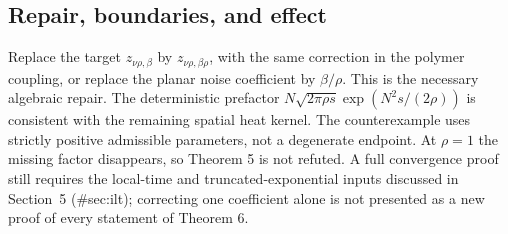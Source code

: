 \documentclass[10pt]{article}
\begin{document}
\subsection*{Repair, boundaries, and effect}
Replace the target \(z_{\nu\rho,\beta}\) by \(z_{\nu\rho,\beta\rho}\), with the same correction in the polymer coupling, or replace the planar noise coefficient by \(\beta/\rho\). This is the necessary algebraic repair. The deterministic prefactor \(N\sqrt{2\pi\rho s}\exp(N^2s/(2\rho))\) is consistent with the remaining spatial heat kernel. The counterexample uses strictly positive admissible parameters, not a degenerate endpoint. At \(\rho=1\) the missing factor disappears, so Theorem 5 is not refuted. A full convergence proof still requires the local-time and truncated-exponential inputs discussed in Section 5 (\#sec:ilt); correcting one coefficient alone is not presented as a new proof of every statement of Theorem 6.\par
\end{document}
